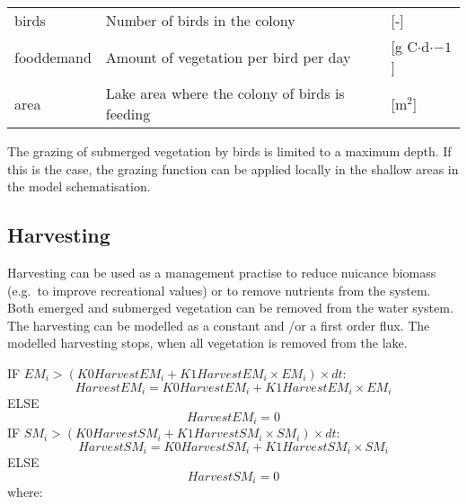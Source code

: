 \begin{tabular}{lll}
birds           & Number of birds in the colony                     & [-]                               \\
fooddemand      & Amount of vegetation per bird per day             & [g C$\cdot$d$\cdot{-1}$]          \\
area            & Lake area where the colony of birds is feeding    & [m$^2$]                           \\
\end{tabular}

The grazing of submerged vegetation by birds is limited to a maximum depth. If this is the case, the
grazing function can be applied locally in the shallow areas in the model schematisation.


\subsection{Harvesting}
Harvesting can be used as a management practise to reduce nuicance biomass (e.g.\ to improve recreational
values) or to remove nutrients from the system. Both emerged and submerged vegetation can be removed from
the water system. The harvesting can be modelled as a constant and /or a first order flux. The modelled
harvesting stops, when all vegetation is removed from the lake.

IF $EM_i > (K0HarvestEM_i + K1HarvestEM_i \times EM_i) \times dt$:
\begin{equation}
\nonumber     HarvestEM_i = K0HarvestEM_i + K1HarvestEM_i \times EM_i
\end{equation}
ELSE
\begin{equation}
\nonumber     HarvestEM_i = 0
\end{equation}
IF $SM_i > (K0HarvestSM_i + K1HarvestSM_i \times SM_i) \times dt$:
\begin{equation}
\nonumber     HarvestSM_i = K0HarvestSM_i + K1HarvestSM_i \times SM_i
\end{equation}
ELSE
\begin{equation}
\nonumber     HarvestSM_i = 0
\end{equation}
%
where:

